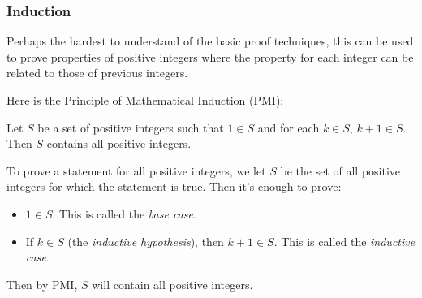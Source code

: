 \documentclass{amsart}
\begin{document}
\subsubsection{Induction}
Perhaps the hardest to understand of the basic proof techniques, this can be
used to prove properties of positive integers where the property for each
integer can be related to those of previous integers.

Here is the Principle of Mathematical Induction (PMI):
\begin{tcolorbox}
Let $S$ be a set of positive integers such that $1\in S$ and for each $k\in S$,
$k+1\in S$. Then $S$ contains all positive integers.
\end{tcolorbox}

To prove a statement for all positive integers, we let $S$ be the set of all
positive integers for which the statement is true. Then it's enough to prove:
\begin{itemize}
  \item $1\in S$. This is called the \emph{base case}.
  \item If $k\in S$ (the \emph{inductive hypothesis}), then $k+1\in S$. This is
    called the \emph{inductive case}.
\end{itemize}
Then by PMI, $S$ will contain all positive integers.
\end{document}

